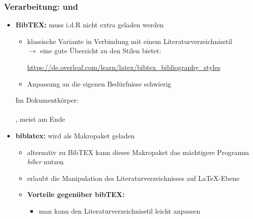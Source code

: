 \subsubsection{Verarbeitung:  und }
\begin{itemize}
	\item \textbf{BibTEX:} muss i.d.R nicht extra geladen werden
	\begin{itemize}
		\item klassische Variante in Verbindung mit einem Literaturverzeichnisstil\\
		$\to$ eine gute Übersicht zu den Stilen bietet:
		\begin{center}
		 \url{https://de.overleaf.com/learn/latex/bibtex_bibliography_styles}
		\end{center}
		\item Anpassung an die eigenen Bedürfnisse schwierig
	\end{itemize}
		Im Dokumentkörper:\\
		\hspace*{0.5cm}\\
		\hspace*{0.5cm} {\color{gray}, meist am Ende}\\
		\hspace*{0.5cm}
	\item \textbf{biblatex:} wird als Makropaket geladen
	\begin{itemize}
		\item alternativ zu BibTEX kann dieses Makropaket das mächtigere Programm \textit{biber} nutzen
		\item erlaubt die Manipulation des Literaturverzeichnisses auf \LaTeX-Ebene
		\item \textbf{Vorteile gegenüber bibTEX:}
		\begin{itemize}
			\item man kann den Literaturverzeichnisstil leicht anpassen

\end{itemize}
\end{itemize}
\end{itemize}
